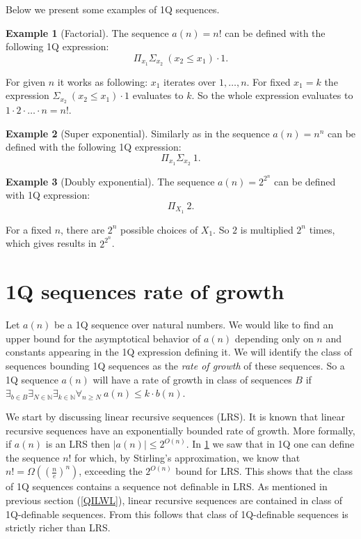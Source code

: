 \documentclass[12pt]{article}
\theoremstyle{definition}
\newtheorem{example}{Example}[section]
\begin{document}
Below we present some examples of 1Q sequences.

\begin{example}[Factorial]
\label{ExSeqFactorial}
    The sequence $a(n) = n!$ can be defined with the following 1Q expression: 
    $$\Pi_{x_1}\Sigma_{x_2} \ (x_2 \leq x_1) \cdot 1.$$

    For given $n$ it works as following: $x_1$ iterates over $1,\ldots,n$. For fixed $x_1 = k$ the expression $\Sigma_{x_2} \ (x_2 \leq x_1) \cdot 1$ evaluates to $k$. So the whole expression evaluates to $1 \cdot 2 \cdot \ldots \cdot n = n!$.
\end{example}

\begin{example}[Super exponential]
\label{ExSeqNToN}
    Similarly as in  the sequence $a(n) = n^n$ can be defined with the following 1Q expression:
    $$\Pi_{x_1}\Sigma_{x_2} \ 1.$$
\end{example}

\begin{example}[Doubly exponential]
\label{ExSeqDoubleExponential}
    The sequence $a(n) = 2^{2^n}$ can be defined with 1Q expression:
    $$\Pi_{X_1} \ 2.$$

    For a fixed $n$, there are $2^n$ possible choices of $X_1$. So $2$ is multiplied $2^n$ times, which gives results in $2^{2^n}$.
\end{example}

\section{1Q sequences rate of growth}
\label{Sec1QRateOfGrowth}
Let $a(n)$ be a 1Q sequence over natural numbers. We would like to find an upper bound for the asymptotical behavior of $a(n)$ depending only on $n$ and constants appearing in the 1Q expression defining it. We will identify the class of sequences bounding 1Q sequences as the \emph{rate of growth} of these sequences. So a 1Q sequence $a(n)$ will have a rate of growth in class of sequences $B$ if $\exists_{b \in B} \exists_{N \in \mathbb{N}} \exists_{k \in \mathbb{N}} \forall_{n \geq N} \ a(n) \leq k \cdot b(n)$.

We start by discussing linear recursive sequences (LRS).
%
It is known that linear recursive sequences have an exponentially bounded rate of growth. More formally, if $a(n)$ is an LRS then $|a(n)| \le 2^{O(n)}$. In \cref{ExSeqFactorial} we saw that in 1Q one can define the sequence $n!$ for which, by Stirling's approximation, we know that $n! = \Omega((\frac{n}{e})^n)$, exceeding the $2^{O(n)}$ bound for LRS. This shows that the class of 1Q sequences contains a sequence not definable in LRS. As mentioned in previous section (\ref{QILWL}), linear recursive sequences are contained in class of 1Q-definable sequences. From this follows that class of 1Q-definable sequences is strictly richer than LRS.
\end{document}

